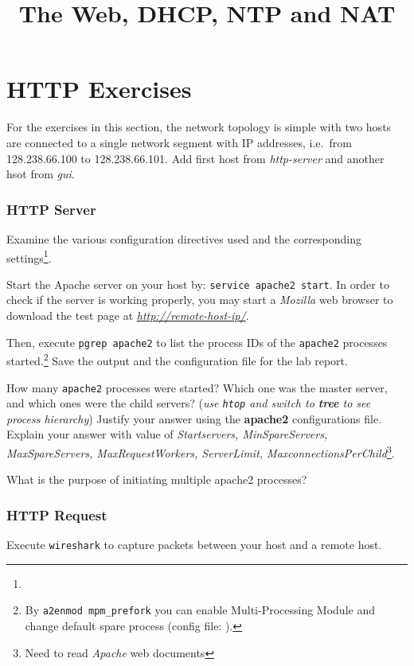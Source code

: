 \documentclass{../UTNetLab}
\title{The Web, DHCP, NTP and NAT}
\begin{document}
\part{HTTP Exercises}
    For the exercises in this section, the network topology is simple with two hosts are connected to a single network segment with IP addresses, i.e.\  from 128.238.66.100 to 128.238.66.101.
    Add first host from \textit{http-server} and another hsot from \textit{gui}.

\section{HTTP Server}
    Examine the various configuration directives used and the corresponding settings\footnote{}.

    Start the Apache server on your host by: \lstinline{service apache2 start}.
    In order to check if the server is working properly, you may start a \textit{Mozilla} web browser to download the test page at \href{http://remote-host-ip/}{\textit{http://remote-host-ip/}}.

    Then, execute \lstinline{pgrep apache2} to list the process IDs of the \lstinline{apache2} processes started.\footnote{By \lstinline{a2enmod mpm_prefork} you can enable Multi-Processing Module and change default spare process (config file: ).}
    Save the output and the configuration file for the lab report.
    
    \begin{report}
    \item How many \lstinline{apache2} processes were started?
    Which one was the master server, and which ones were the child servers? (\textit{use \lstinline{htop} and switch to \textbf{tree} to see process hierarchy})
    Justify your answer using the \textbf{apache2} configurations file.
    Explain your answer with value of \textit{Startservers, MinSpareServers, MaxSpareServers, MaxRequestWorkers, ServerLimit, MaxconnectionsPerChild}\footnote{Need to read \textit{Apache} web documents}.
    
    \item What is the purpose of initiating multiple apache2 processes?
    \end{report}

\section{HTTP Request}
    Execute \lstinline{wireshark} to capture packets between your host and a remote host.
\end{document}
